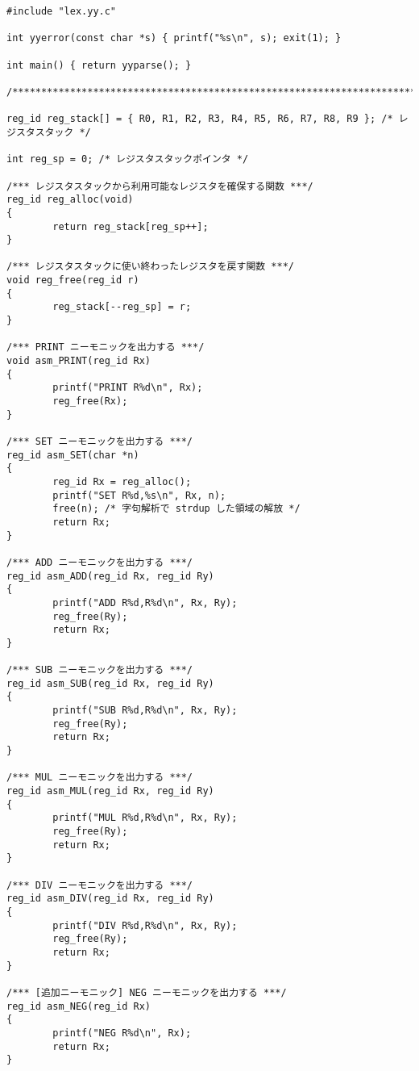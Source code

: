 \documentclass[a4j]{jsarticle}  %
\begin{document}
\begin{verbatim}
#include "lex.yy.c"

int yyerror(const char *s) { printf("%s\n", s); exit(1); }

int main() { return yyparse(); }

/*****************************************************************************/

reg_id reg_stack[] = { R0, R1, R2, R3, R4, R5, R6, R7, R8, R9 }; /* レジスタスタック */

int reg_sp = 0; /* レジスタスタックポインタ */

/*** レジスタスタックから利用可能なレジスタを確保する関数 ***/
reg_id reg_alloc(void)
{
        return reg_stack[reg_sp++];
}

/*** レジスタスタックに使い終わったレジスタを戻す関数 ***/
void reg_free(reg_id r)
{
        reg_stack[--reg_sp] = r;
}

/*** PRINT ニーモニックを出力する ***/
void asm_PRINT(reg_id Rx)
{
        printf("PRINT R%d\n", Rx);
        reg_free(Rx);
}

/*** SET ニーモニックを出力する ***/
reg_id asm_SET(char *n)
{
        reg_id Rx = reg_alloc();
        printf("SET R%d,%s\n", Rx, n);
        free(n); /* 字句解析で strdup した領域の解放 */
        return Rx;
}

/*** ADD ニーモニックを出力する ***/
reg_id asm_ADD(reg_id Rx, reg_id Ry)
{
        printf("ADD R%d,R%d\n", Rx, Ry);
        reg_free(Ry);
        return Rx;
}

/*** SUB ニーモニックを出力する ***/
reg_id asm_SUB(reg_id Rx, reg_id Ry)
{
        printf("SUB R%d,R%d\n", Rx, Ry);
        reg_free(Ry);
        return Rx;
}

/*** MUL ニーモニックを出力する ***/
reg_id asm_MUL(reg_id Rx, reg_id Ry)
{
        printf("MUL R%d,R%d\n", Rx, Ry);
        reg_free(Ry);
        return Rx;
}

/*** DIV ニーモニックを出力する ***/
reg_id asm_DIV(reg_id Rx, reg_id Ry)
{
        printf("DIV R%d,R%d\n", Rx, Ry);
        reg_free(Ry);
        return Rx;
}

/*** [追加ニーモニック] NEG ニーモニックを出力する ***/
reg_id asm_NEG(reg_id Rx)
{
        printf("NEG R%d\n", Rx);
        return Rx;
}
\end{verbatim}
\end{document}

